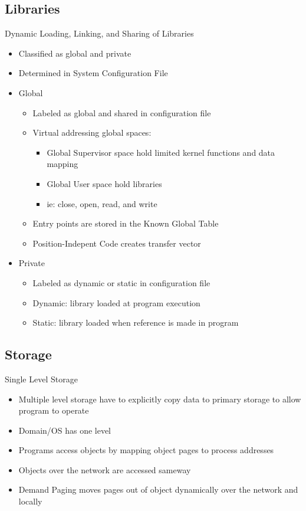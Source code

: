\documentclass{beamer}
\begin{document}
\subsection{Libraries}

\begin{frame}{Dynamic Loading, Linking, and Sharing of Libraries}
	\begin{itemize}
	\item Classified as global and private
	\item Determined in System Configuration File
	\item Global
		\begin{itemize}
		\item Labeled as global and shared in configuration file
		\item Virtual addressing global spaces:
			\begin{itemize}
			\item Global Supervisor space hold limited kernel functions and data mapping
			\item Global User space hold libraries
			\item ie: close, open, read, and write
			\end{itemize}
		\item Entry points are stored in the Known Global Table
		\item Position-Indepent Code creates transfer vector
		\end{itemize}
	\item Private
		\begin{itemize}
		\item Labeled as dynamic or static in configuration file
		\item Dynamic: library loaded at program execution
		\item Static: library loaded when reference is made in program
		\end{itemize}
	\end{itemize}
\end{frame}

\subsection{Storage}

\begin{frame}{Single Level Storage}
	\begin{itemize}
	\item Multiple level storage have to explicitly copy data to primary storage to allow program to operate
	\item Domain/OS has one level
	\item Programs access objects by mapping object pages to process addresses
	\item Objects over the network are accessed sameway
	\item Demand Paging moves pages out of object dynamically over the network and locally
	\end{itemize}
\end{frame}
\end{document}
